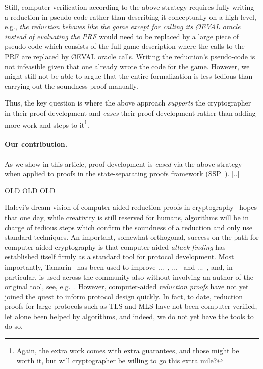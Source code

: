 {Still, computer-verification according to the above strategy requires fully writing a reduction in pseudo-code rather than describing it conceptually on a high-level, e.g., \emph{the reduction behaves like the game except for calling its \O{EVAL} oracle instead of evaluating the PRF} would need
to be replaced by a large piece of pseudo-code which consists of the full game description where the calls to the PRF are replaced by \O{EVAL} oracle calls.
Writing the reduction's pseudo-code is not infeasible given that one already
wrote the code for the game. However, we might still not be able to argue that 
the entire formalization is less tedious than carrying out the soundness proof manually.

Thus, the key question is where the above approach \emph{supports} the cryptographer
in their proof development and \emph{eases} their proof development rather than adding more work and steps to it\footnote{Again, the extra work comes with extra guarantees, and those might be worth it, but will cryptographer be willing to go this extra mile?}.

\paragraph{Our contribution.} As we show in this article, proof development is \emph{eased} via the above strategy when applied to proofs in the state-separating proofs framework (SSP~\cite{X}). [..]

\iffalse
\clearpage
OLD OLD OLD



Halevi's dream-vision of computer-aided reduction proofs in cryptography~\cite{Halevi} hopes that one day, while creativity is still reserved for humans, algorithms will be in charge of tedious steps which confirm the soundness of a reduction and only use standard techniques. An important, somewhat orthogonal, success on the path for computer-aided cryptography is that computer-aided \emph{attack-finding} has established itself firmly as a standard tool for protocol development. Most importantly, Tamarin~\cite{X} has been used to improve ...~\cite{X}, ...~\cite{X} and ...~\cite{X}, and, in particular, is used across the community also without involving an author of the original tool, see, e.g.~\cite{X}. However, computer-aided \emph{reduction proofs} have not yet joined the quest to inform protocol design quickly. In fact, to date, reduction proofs for large protocols such as TLS and MLS have not been computer-verified, let alone been helped by algorithms, and indeed, we do not yet have the tools to do so.

}
